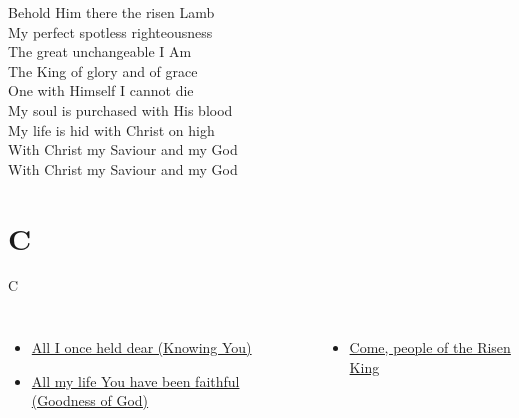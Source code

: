 \documentclass{beamer}
\begin{document}
{\begin{frame}{}
\end{frame}

\hypertarget{Before the throne of God above[]3}{}
\begin{frame}{}
\fontsize{ 15 }{ 19 }\selectfont

Behold Him there the risen Lamb\\ 
My perfect spotless righteousness\\ 
The great unchangeable I Am\\ 
The King of glory and of grace\\ 
One with Himself I cannot die\\ 
My soul is purchased with His blood\\ 
My life is hid with Christ on high\\ 
With Christ my Saviour and my God\\ 
With Christ my Saviour and my God 

\end{frame}

}
\section{C}

\begin{frame}{C}
\begin{columns}
    \begin{itemize}
    \item \hyperlink{Knowing You['All I once held dear']1}{All I once held dear (Knowing You)}
    \item \hyperlink{Goodness of God['All my life You have been faithful']1}{All my life You have been faithful (Goodness of God)}
\end{itemize}
    \begin{itemize}
    \item \hyperlink{Come, people of the Risen King[]1}{Come, people of the Risen King }
\end{itemize}


\end{columns}

\end{frame}
\end{document}

